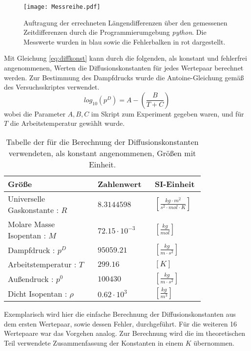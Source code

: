 \begin{figure}[H]
	\centering	
	\begin{minipage}{1\textwidth}
		\texttt{[image: Messreihe.pdf]}
	\end{minipage}
	\caption{Auftragung der errechneten Längendifferenzen über den gemessenen Zeitdifferenzen durch die Programmierumgebung \textit{python}. Die Messwerte wurden in blau sowie die Fehlerbalken in rot dargestellt.}
	\label{Messreihe}
\end{figure} 
Mit Gleichung \ref{eq:diffkonst} kann durch die folgenden, als konstant und fehlerfrei angenommenen, Werten die Diffusionskonstanten für jedes Wertepaar berechnet werden. Zur Bestimmung des Dampfdrucks wurde die Antoine-Gleichung gemäß des Versuchsskriptes verwendet. 
\begin{equation}
log_{10}(p^D) = A-(\frac{B}{T+C})
\end{equation}
wobei die Parameter $A,B,C$ im Skript zum Experiment gegeben waren, und für $T$ die Arbeitstemperatur gewählt wurde.
\begin{table}[H]
	\centering
	\label{Konstanten}
	\caption{Tabelle der für die Berechnung der Diffusionskonstanten verwendeten, als konstant angenommenen, Größen mit Einheit. \cite{Skript} }
	\begin{tabular}{C{0.4\linewidth}|C{0.2\linewidth}|C{0.2\linewidth}}
		Größe  &  Zahlenwert & SI-Einheit\\
		\hline \addlinespace[1ex] 
		Universelle Gaskonstante  : $R$&  $8.3144598$&$ \left[\si{\frac{kg\cdot m^2}{s^2 \cdot  mol \cdot K}}  \right]$  \\
		Molare Masse Isopentan : $M$ & $72.15\cdot 10^{-3}$ & $\left[ \si{\frac{kg}{mol}}\right]$\\
		Dampfdruck : $p^D$& $95059.21$ & $\left[ \si{\frac{kg}{m \cdot s^2}}\right]$\\
		Arbeitstemperatur : $T$ & $299.16$& $[ \si{K}]$ \\
		Außendruck : $p^0$ & $100430$& $\left[ \si{\frac{kg}{m\cdot s^2}} \right]$ \\
		Dicht Isopentan : $\rho$ & $0.62\cdot 10^3 $& $\left[ \si{\frac{kg}{m^3}}\right]$ \\
	\end{tabular}
\end{table}
Exemplarisch wird hier die einfache Berechnung der Diffusionskonstanten aus dem ersten Wertepaar, sowie dessen Fehler, durchgeführt. Für die weiteren 16 Wertepaare war das Vorgehen analog. Zur Berechnung wird die im theoretischen Teil verwendete Zusammenfassung der Konstanten in einem $K$ übernommen.
